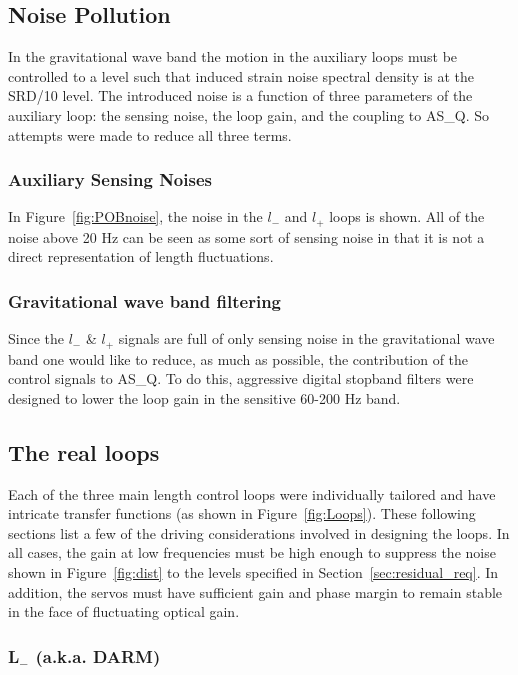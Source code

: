 \subsection{Noise Pollution}

In the gravitational wave band the motion in the auxiliary loops must be controlled to a level
such that induced strain noise spectral density is at the SRD/10 level. The
introduced noise is a function of three parameters of the auxiliary loop:
the sensing noise, the loop gain, and the coupling to AS\_Q. So attempts
were made to reduce all three terms.

\subsubsection{Auxiliary Sensing Noises}

In Figure~\ref{fig:POBnoise}, the noise in the $l_-$ and $l_+$ loops is shown. 
All of the noise above 20 Hz can be seen as some sort of sensing noise in 
that it is not a direct representation of length fluctuations. 

\subsubsection{Gravitational wave band filtering}

Since the $l_{-}$ \& $l_{+}$ signals are full of only sensing noise in
the gravitational wave band one would like to reduce, as much as possible, the contribution
of the control signals to AS\_Q. To do this, aggressive digital stopband
filters were designed to lower the loop gain in the sensitive 60-200 Hz
band.


\subsection{The real loops}

Each of the three main length control loops were individually tailored and
have intricate transfer functions (as shown in Figure~\ref{fig:Loops}).
These following sections list a few of the driving considerations involved
in designing the loops. In all cases, the gain at low frequencies must be
high enough to suppress the noise shown in Figure~\ref{fig:dist} to the
levels specified in Section~\ref{sec:residual_req}. In addition, the servos
must have sufficient gain and phase margin to remain stable in the face
of fluctuating optical gain.


\subsubsection{L$_-$ (a.k.a. DARM)}

